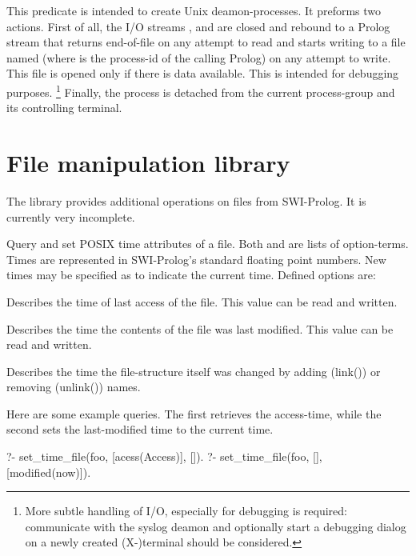 \documentclass[11pt]{article}
\begin{document}
\begin{description}
This predicate is intended to create Unix deamon-processes. It preforms
two actions.  First of all, the I/O streams , 
 and  are closed and rebound to
a Prolog stream that returns end-of-file on any attempt to read and
starts writing to a file named  (where  is
the process-id of the calling Prolog) on any attempt
to write.  This file is opened only if there is data available.  This is
intended for debugging purposes.%
    \footnote{More subtle handling of I/O, especially for debugging is
	      required: communicate with the syslog deamon and
	      optionally start a debugging dialog on a newly created
	      (X-)terminal should be considered.}
Finally, the process is detached from the current process-group and its
controlling terminal.
\end{description}


\section{File manipulation library}

The  library provides additional operations on files from
SWI-Prolog.  It is currently very incomplete.

\begin{description}
Query and set POSIX time attributes of a file.  Both 
and  are lists of option-terms.  Times are represented
in SWI-Prolog's standard floating point numbers.  New times may
be specified as  to indicate the current time.  Defined
options are:

\begin{description}
Describes the time of last access of the file.  This value can be
read and written.

Describes the time the contents of the file was last modified.
This value can be read and written.

Describes the time the file-structure itself was changed by adding
(link()) or removing (unlink()) names.
\end{description}

Here are some example queries.  The first retrieves the access-time,
while the second sets the last-modified time to the current time.

\begin{code}
?- set_time_file(foo, [acess(Access)], []).
?- set_time_file(foo, [], [modified(now)]).
\end{code}

\noindent
\end{description}
\end{document}
